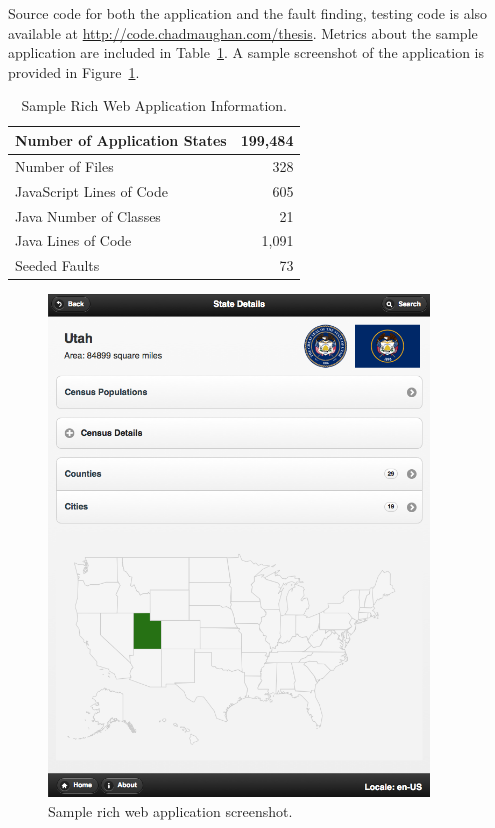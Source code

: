 Source code for both the application and the fault finding, testing code is also available at \url{http://code.chadmaughan.com/thesis}.  Metrics about the sample application are included in Table~\ref{table:sampleAppInfo}.  A sample screenshot of the application is provided in Figure~\ref{fig:screenshot}.

\begin{table}[h]
	\centering
	\caption{Sample Rich Web Application Information.}
	\begin{tabular}{| l | r|}
		\hline
Number of Application States		& 199,484 	\\ \hline
Number of Files				& 328 		\\ \hline
JavaScript Lines of Code			& 605 		\\ \hline
Java Number of Classes			& 21 		\\ \hline
Java Lines of Code				& 1,091 		\\ \hline
Seeded Faults					& 73 		\\ \hline
	\end{tabular}
\label{table:sampleAppInfo}
\end{table}

\begin{figure}[htbp]
\centering
\includegraphics[width=0.9\textwidth]{images/ipad-screenshot.png}
\caption{Sample rich web application screenshot.}
\label{fig:screenshot}
\end{figure}


